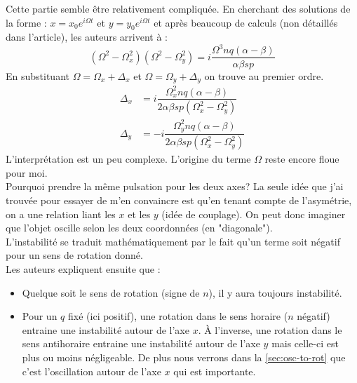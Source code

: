 \documentclass[12pt,a4paper]{article}
\begin{document}
	Cette partie semble être relativement compliquée. En cherchant des solutions de la forme : $x=x_0e^{i\Omega t}$ et $y=y_0e^{i\Omega t}$ et après beaucoup de calculs (non détaillés dans l'article), les auteurs arrivent à :
	\begin{equation}
		(\Omega^2-\Omega_x^2)(\Omega^2-\Omega_y^2)=i\dfrac{\Omega^3 nq(\alpha-\beta)}{\alpha\beta sp}
	\end{equation}
	En substituant $\Omega=\Omega_x+\Delta_x$ et $\Omega=\Omega_y+\Delta_y$ on trouve au premier ordre.
	\begin{align}
	\Delta_x &= i\dfrac{\Omega_x^2 nq(\alpha-\beta)}{2\alpha\beta s p(\Omega_x^2-\Omega_y^2)}\\[2ex]
	\Delta_y &= -i\dfrac{\Omega_y^2 nq(\alpha-\beta)}{2\alpha\beta s p(\Omega_x^2-\Omega_y^2)}
	\end{align}
	L'interprétation est un peu complexe. L'origine du terme $\Omega$ reste encore floue pour moi.\\
	Pourquoi prendre la même pulsation pour les deux axes? La seule idée que j'ai trouvée pour essayer de m'en convaincre est qu'en tenant compte de l'asymétrie, on a une relation liant les $x$ et les $y$ (idée de couplage). On peut donc imaginer que l'objet oscille selon les deux coordonnées (en "diagonale").\\
	L'instabilité se traduit mathématiquement par le fait qu'un terme soit négatif pour un sens de rotation donné.\\
	Les auteurs expliquent ensuite que :
	\begin{itemize}
		\item Quelque soit le sens de rotation (signe de $n$), il y aura toujours instabilité.
		\item Pour un $q$ fixé (ici positif), une rotation dans le sens horaire ($n$ négatif) entraine une instabilité autour de l'axe $x$. À l'inverse, une rotation dans le sens antihoraire entraine une instabilité autour de l'axe $y$ mais celle-ci est plus ou moins négligeable. De plus nous verrons dans la \autoref{sec:osc-to-rot} que c'est l'oscillation autour de l'axe $x$ qui est importante.
	\end{itemize}
\end{document}
